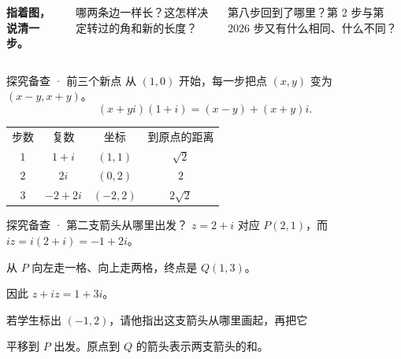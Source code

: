 \documentclass[aspectratio=169,10pt]{beamer}
\newcommand{\accenttext}[1]{{\color{teal}\bfseries #1}}
\newcommand{\breath}{\par\vspace{3.5mm}}
\begin{document}
\begin{campussummary}
\begin{columns}[c,onlytextwidth]
\centering
{}
\accenttext{指着图，说清一步。}\par
哪两条边一样长？这怎样决定转过的角和新的长度？
\breath\accenttext{回到开场的猜想。}\par
第八步回到了哪里？第 $2$ 步与第 $2026$ 步又有什么相同、什么不同？
\end{columns}
\end{campussummary}
\ifdefined\TeacherEdition
\begin{frame}{探究备查 · 前三个新点}
从 $(1,0)$ 开始，每一步把点 $(x,y)$ 变为 $(x-y,x+y)$。
\[
   (x+yi)(1+i)=(x-y)+(x+y)i .
\]
\centering
\renewcommand{\arraystretch}{1.35}
\begin{tabular}{c@{\qquad}c@{\qquad}c@{\qquad}c}
步数 & 复数 & 坐标 & 到原点的距离\\
$1$ & $1+i$ & $(1,1)$ & $\sqrt2$\\
$2$ & $2i$ & $(0,2)$ & $2$\\
$3$ & $-2+2i$ & $(-2,2)$ & $2\sqrt2$
\end{tabular}
\end{frame}
\begin{frame}{探究备查 · 第二支箭头从哪里出发？}
$z=2+i$ 对应 $P(2,1)$，而 $iz=i(2+i)=-1+2i$。\breath
从 $P$ 向左走一格、向上走两格，终点是 $Q(1,3)$。\par
因此 $z+iz=1+3i$。\breath
若学生标出 $(-1,2)$，请他指出这支箭头从哪里画起，再把它\par
平移到 $P$ 出发。原点到 $Q$ 的箭头表示两支箭头的和。
\end{frame}
\fi
\end{document}
